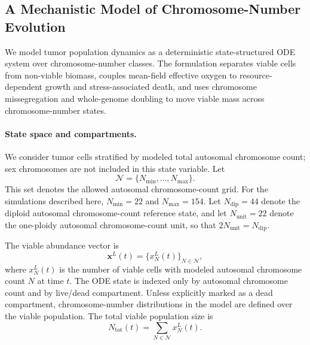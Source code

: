 \documentclass[11pt]{article}
\begin{document}
\clearpage

\subsection{A Mechanistic Model of Chromosome-Number Evolution}
\label{ode}

We model tumor population dynamics as a deterministic state-structured ODE system over chromosome-number classes. The formulation separates viable cells from non-viable biomass, couples mean-field effective oxygen to resource-dependent growth and stress-associated death, and uses chromosome missegregation and whole-genome doubling to move viable mass across chromosome-number states.

\paragraph{State space and compartments.}

We consider tumor cells stratified by modeled total autosomal chromosome count; sex chromosomes are not included in this state variable. Let
\begin{equation}
\mathcal{N}=\{N_{\min},\dots,N_{\max}\}.
\label{eq:appendix_state_grid}
\end{equation}
This set denotes the allowed autosomal chromosome-count grid. For the simulations described here, $N_{\min}=22$ and $N_{\max}=154$. Let $N_{\mathrm{dip}}=44$ denote the diploid autosomal chromosome-count reference state, and let $N_{\mathrm{unit}}=22$ denote the one-ploidy autosomal chromosome-count unit, so that $2N_{\mathrm{unit}}=N_{\mathrm{dip}}$.

The viable abundance vector is
\begin{equation}
\mathbf{x}^L(t)=\{x_N^L(t)\}_{N\in\mathcal N},
\label{eq:appendix_viable_vector}
\end{equation}
where $x_N^L(t)$ is the number of viable cells with modeled autosomal chromosome count $N$ at time $t$. The ODE state is indexed only by autosomal chromosome count and by live/dead compartment. Unless explicitly marked as a dead compartment, chromosome-number distributions in the model are defined over the viable population. The total viable population size is
\begin{equation}
N_{\mathrm{tot}}(t)=\sum_{N\in\mathcal N}x_N^L(t).
\label{eq:appendix_total_viable_population}
\end{equation}
\end{document}
